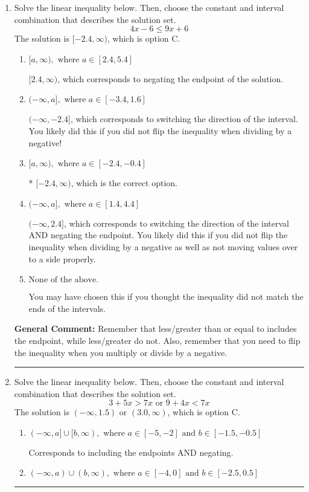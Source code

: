 \documentclass{extbook}[14pt]
\newcommand{\litem}[1]{\item #1

\rule{\textwidth}{0.4pt}}
\begin{document}
\begin{enumerate}\litem{
Solve the linear inequality below. Then, choose the constant and interval combination that describes the solution set.
\[ 4x -6 \leq 9x + 6 \]The solution is \( [-2.4, \infty) \), which is option C.\begin{enumerate}[label=\Alph*.]
\item \( [a, \infty), \text{ where } a \in [2.4, 5.4] \)

 $[2.4, \infty)$, which corresponds to negating the endpoint of the solution.
\item \( (-\infty, a], \text{ where } a \in [-3.4, 1.6] \)

 $(-\infty, -2.4]$, which corresponds to switching the direction of the interval. You likely did this if you did not flip the inequality when dividing by a negative!
\item \( [a, \infty), \text{ where } a \in [-2.4, -0.4] \)

* $[-2.4, \infty)$, which is the correct option.
\item \( (-\infty, a], \text{ where } a \in [1.4, 4.4] \)

 $(-\infty, 2.4]$, which corresponds to switching the direction of the interval AND negating the endpoint. You likely did this if you did not flip the inequality when dividing by a negative as well as not moving values over to a side properly.
\item \( \text{None of the above}. \)

You may have chosen this if you thought the inequality did not match the ends of the intervals.
\end{enumerate}

\textbf{General Comment:} Remember that less/greater than or equal to includes the endpoint, while less/greater do not. Also, remember that you need to flip the inequality when you multiply or divide by a negative.
}
\litem{
Solve the linear inequality below. Then, choose the constant and interval combination that describes the solution set.
\[ 3 + 5 x > 7 x \text{ or } 9 + 4 x < 7 x \]The solution is \( (-\infty, 1.5) \text{ or } (3.0, \infty) \), which is option C.\begin{enumerate}[label=\Alph*.]
\item \( (-\infty, a] \cup [b, \infty), \text{ where } a \in [-5, -2] \text{ and } b \in [-1.5, -0.5] \)

Corresponds to including the endpoints AND negating.
\item \( (-\infty, a) \cup (b, \infty), \text{ where } a \in [-4, 0] \text{ and } b \in [-2.5, 0.5] \)


\end{enumerate}}
\end{enumerate}
\end{document}
